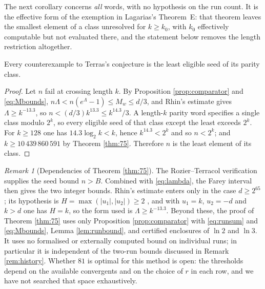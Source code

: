 \documentclass[11pt,a4paper]{article}
\theoremstyle{plain}\newtheorem{theorem}{Theorem}\newtheorem{proposition}[theorem]{Proposition}
\theoremstyle{definition}\newtheorem{example}[theorem]{Example}
\theoremstyle{remark}\newtheorem{remark}[theorem]{Remark}
\begin{document}
The next corollary concerns \emph{all} words, with no hypothesis on the run count. It is the
effective form of the exemption in Lagarias's Theorem~E: that theorem leaves the smallest
element of a class unresolved for $k\ge k_0$, with $k_0$ effectively computable but not
evaluated there, and the statement below removes the length restriction altogether.

\begin{corollary}\label{cor:least}
Every counterexample to Terras's conjecture is the least eligible seed of its parity class.
\end{corollary}
\begin{proof}
Let $n$ fail at crossing length $k$. By Proposition \ref{prop:comparator} and
\eqref{eq:Mbounds}, $n\Lambda<n(e^\Lambda-1)\le M_w\le d/3$, and Rhin's estimate gives
$\Lambda\ge k^{-13.3}$, so $n<(d/3)k^{13.3}\le k^{14.3}/3$. A length-$k$ parity word specifies
a single class modulo $2^k$, so every eligible seed of that class except the least exceeds
$2^k$. For $k\ge128$ one has $14.3\log_2k<k$, hence $k^{14.3}<2^k$ and so $n<2^k$; and
$k\ge10\,439\,860\,591$ by Theorem \ref{thm:75}. Therefore $n$ is the least element of its
class.
\end{proof}

\begin{remark}[Dependencies of Theorem \ref{thm:75}]
The Rozier--Terracol verification supplies the seed bound $n>B$. Combined with
\eqref{eq:lambda}, the Farey interval then gives the two integer bounds. Rhin's estimate enters
only in the case $d\ge2^{65}$; its hypothesis is $H=\max(|u_1|,|u_2|)\ge2$
\cite[Prop.~6.3]{rozier2026}, and with $u_1=k$, $u_2=-d$ and $k>d$ one has $H=k$, so the form
used is $\Lambda\ge k^{-13.3}$. Beyond these, the proof of Theorem \ref{thm:75} uses only
Proposition \ref{prop:comparator} with \eqref{eq:runsum} and \eqref{eq:Mbounds},
Lemma \ref{lem:runbound}, and certified enclosures of $\ln2$ and $\ln3$. It uses no
formalised or externally computed bound on individual runs; in particular it is independent of
the two-run bounds discussed in Remark \ref{rem:history}. Whether $81$ is optimal for this
method is open: the thresholds depend on the available convergents and on the choice of $r$ in
each row, and we have not searched that space exhaustively.
\end{remark}
\end{document}

